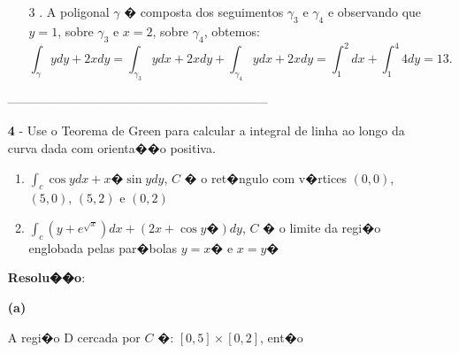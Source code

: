\documentclass[12pt]{article}
\begin{document}
\begin{enumerate}
\begin{enumerate}
              \item[3]. A poligonal $\gamma$ � composta dos seguimentos $\gamma_3$ e $\gamma_4$ e observando que $y=1$, sobre $\gamma_3$ e $x=2$, sobre $\gamma_4$, obtemos:
                    $$\int_\gamma ydy + 2xdy = \int_{\gamma_3} ydx + 2xdy + \int_{\gamma_4} ydx + 2xdy = \int_1^2 dx + \int_1^4 4dy = 13.$$
          \end{enumerate}
          \begin{center}
              ---------------------------------------------------------------
          \end{center}
    \item[\textbf{4}]- Use o Teorema de Green para calcular a integral de linha ao longo da curva dada com orienta��o positiva.

          \begin{enumerate}
              \item $\int_c \cos ydx + x� \sin y dy$, $C$ � o ret�ngulo com v�rtices $(0,0)$, $(5,0)$, $(5,2)$ e $(0,2)$
              \item $\int_c (y+ e^{\sqrt{x}}) dx + (2x + \cos y�)dy$, $C$ � o limite da regi�o englobada pelas par�bolas $y=x�$ e $x=y�$
          \end{enumerate}

          \textbf{Resolu��o}:

          \textbf{(a)}

          A regi�o D cercada por $C$ �: $[0,5] \times [0,2]$, ent�o


\end{enumerate}
\end{document}
